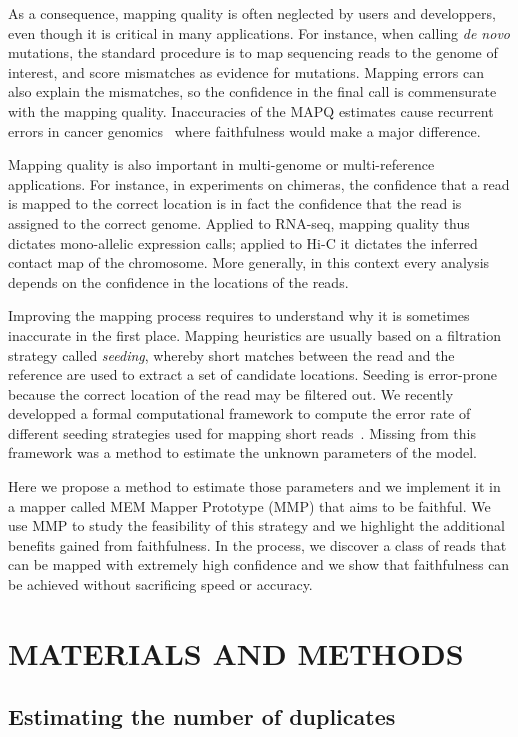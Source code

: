 \documentclass[a4,center,fleqn]{NAR}
\begin{document}
As a consequence, mapping quality is often neglected by users and
developpers, even though it is critical in many applications. For
instance, when calling \textit{de novo} mutations, the standard procedure
is to map sequencing reads to the genome of interest, and score mismatches
as evidence for mutations. Mapping errors can also explain the mismatches,
so the confidence in the final call is commensurate with the mapping
quality. Inaccuracies of the MAPQ estimates cause recurrent errors in
cancer genomics~\cite{dunno} where faithfulness would make a major
difference.

Mapping quality is also important in multi-genome or multi-reference
applications. For instance, in experiments on chimeras, the confidence
that a read is mapped to the correct location is in fact the confidence
that the read is assigned to the correct genome. Applied to RNA-seq,
mapping quality thus dictates mono-allelic expression calls; applied to
Hi-C it dictates the inferred contact map of the chromosome. More
generally, in this context every analysis depends on the confidence in
the locations of the reads.

Improving the mapping process requires to understand why it is sometimes
inaccurate in the first place. Mapping heuristics are usually based on a
filtration strategy called \emph{seeding}, whereby short matches between
the read and the reference are used to extract a set of candidate
locations. Seeding is error-prone because the correct location of the read
may be filtered out. We recently developped a formal computational
framework to compute the error rate of different seeding strategies used
for mapping short reads~\cite{Filion619155}. Missing from this framework
was a method to estimate the unknown parameters of the model.

Here we propose a method to estimate those parameters and we implement it
in a mapper called MEM Mapper Prototype (MMP) that aims to be faithful. We
use MMP to study the feasibility of this strategy and we highlight the
additional benefits gained from faithfulness. In the process, we discover
a class of reads that can be mapped with extremely high confidence and we
show that faithfulness can be achieved without sacrificing speed or
accuracy.


\section{MATERIALS AND METHODS}

\subsection{Estimating the number of duplicates}
\end{document}
